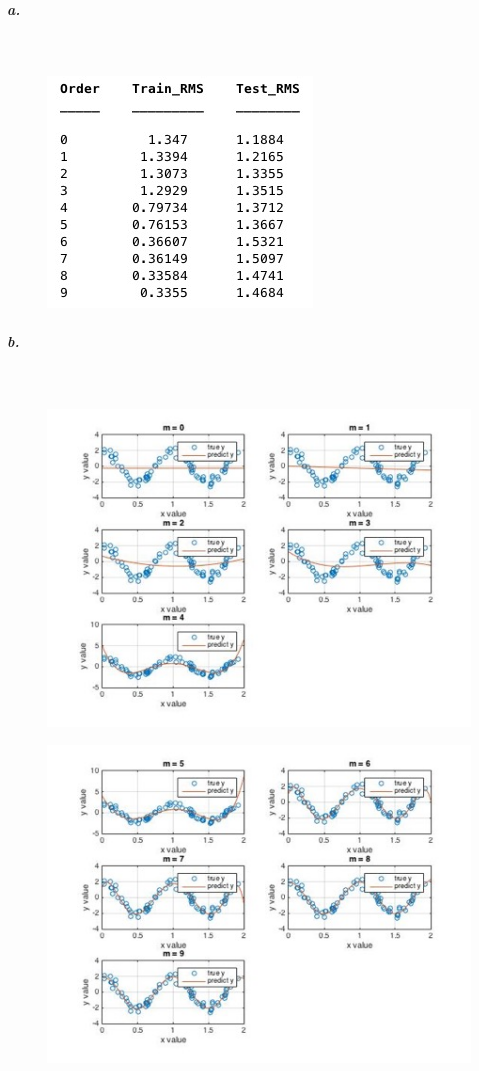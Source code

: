\documentclass[]{article}
\begin{document}
	\subparagraph{a.}\mbox{}\\
	
	\begin{figure}[H]
		\centering
		\includegraphics[width=0.8\linewidth]{2ga1}
		\caption{}
		\label{fig:2ga1}
	\end{figure}
	
	\subparagraph{b.}\mbox{}\\
	
	\begin{figure}[H]
		\centering
		\includegraphics[width=0.8\linewidth]{2gb1}
		\caption{}
		\label{fig:2gb1}
	\end{figure}
	\begin{figure}[H]
		\centering
		\includegraphics[width=0.8\linewidth]{2gb2}
		\caption{}
		\label{fig:2gb2}
	\end{figure}
	
\end{document}
